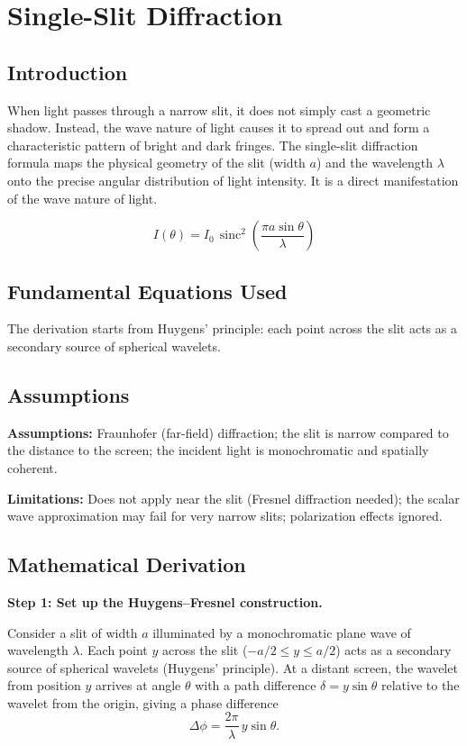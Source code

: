 \chapter{Single-Slit Diffraction}

\section*{Introduction}

When light passes through a narrow slit, it does not simply cast a geometric shadow. Instead, the wave nature of light causes it to spread out and form a characteristic pattern of bright and dark fringes. The single-slit diffraction formula maps the physical geometry of the slit (width $a$) and the wavelength $\lambda$ onto the precise angular distribution of light intensity. It is a direct manifestation of the wave nature of light.


\begin{equation}
I(\theta) = I_0\,\operatorname{sinc}^2\!\left(\frac{\pi a \sin\theta}{\lambda}\right)
\end{equation}

\section*{Fundamental Equations Used}

The derivation starts from Huygens' principle: each point across the slit acts as a secondary source of spherical wavelets.

\section*{Assumptions}

\textbf{Assumptions:} Fraunhofer (far-field) diffraction; the slit is narrow compared to the distance to the screen; the incident light is monochromatic and spatially coherent.


\textbf{Limitations:} Does not apply near the slit (Fresnel diffraction needed); the scalar wave approximation may fail for very narrow slits; polarization effects ignored.


\section*{Mathematical Derivation}

\textbf{Step 1: Set up the Huygens--Fresnel construction.}

Consider a slit of width $a$ illuminated by a monochromatic plane wave of wavelength $\lambda$. Each point $y$ across the slit ($-a/2 \leq y \leq a/2$) acts as a secondary source of spherical wavelets (Huygens' principle). At a distant screen, the wavelet from position $y$ arrives at angle $\theta$ with a path difference $\delta = y\sin\theta$ relative to the wavelet from the origin, giving a phase difference
\begin{equation}
\Delta\phi = \frac{2\pi}{\lambda}\,y\sin\theta.
\end{equation}


